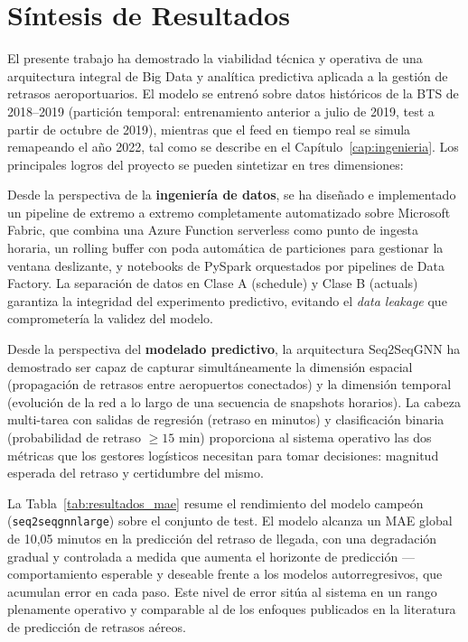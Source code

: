 \documentclass[12pt,oneside,a4paper]{report}
\renewcommand{\_}{\textunderscore\allowbreak}
\begin{document}
\section{Síntesis de Resultados}
\label{sec:sintesis}

El presente trabajo ha demostrado la viabilidad técnica y operativa de una arquitectura integral de Big Data y analítica predictiva aplicada a la gestión de retrasos aeroportuarios. El modelo se entrenó sobre datos históricos de la BTS de 2018--2019 (partición temporal: entrenamiento anterior a julio de 2019, test a partir de octubre de 2019), mientras que el feed en tiempo real se simula remapeando el año 2022, tal como se describe en el Capítulo~\ref{cap:ingenieria}. Los principales logros del proyecto se pueden sintetizar en tres dimensiones:

Desde la perspectiva de la \textbf{ingeniería de datos}, se ha diseñado e implementado un pipeline de extremo a extremo completamente automatizado sobre Microsoft Fabric, que combina una Azure Function serverless como punto de ingesta horaria, un rolling buffer con poda automática de particiones para gestionar la ventana deslizante, y notebooks de PySpark orquestados por pipelines de Data Factory. La separación de datos en Clase A (schedule) y Clase B (actuals) garantiza la integridad del experimento predictivo, evitando el \textit{data leakage} que comprometería la validez del modelo.

Desde la perspectiva del \textbf{modelado predictivo}, la arquitectura Seq2SeqGNN ha demostrado ser capaz de capturar simultáneamente la dimensión espacial (propagación de retrasos entre aeropuertos conectados) y la dimensión temporal (evolución de la red a lo largo de una secuencia de snapshots horarios). La cabeza multi-tarea con salidas de regresión (retraso en minutos) y clasificación binaria (probabilidad de retraso $\geq 15$ min) proporciona al sistema operativo las dos métricas que los gestores logísticos necesitan para tomar decisiones: magnitud esperada del retraso y certidumbre del mismo.

La Tabla~\ref{tab:resultados_mae} resume el rendimiento del modelo campeón
(\texttt{seq2seq\_gnn\_large}) sobre el conjunto de test. El modelo alcanza un MAE global
de 10,05 minutos en la predicción del retraso de llegada, con una degradación gradual y
controlada a medida que aumenta el horizonte de predicción --- comportamiento esperable y
deseable frente a los modelos autorregresivos, que acumulan error en cada paso. Este nivel
de error sitúa al sistema en un rango plenamente operativo y comparable al de los enfoques
publicados en la literatura de predicción de retrasos aéreos.
\end{document}
